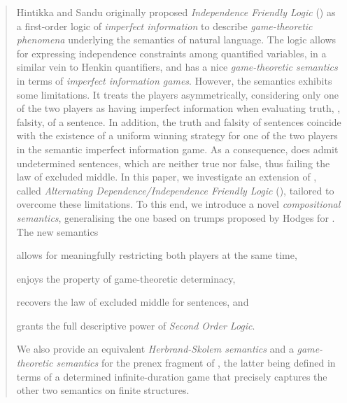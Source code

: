 \documentclass[authoryear]{elsarticle}
\begin{document}
\begin{abstract}

Hintikka and Sandu originally proposed \emph{Independence Friendly Logic} (\IF)
as a first-order logic of \emph{imperfect information} to describe
\emph{game-theoretic phenomena} underlying the semantics of natural language.
The logic allows for expressing independence constraints among quantified
variables, in a similar vein to Henkin quantifiers, and has a nice
\emph{game-theoretic semantics} in terms of \emph{imperfect information games}.
However, the \IF semantics exhibits some limitations.
It treats the players asymmetrically, considering only one of the two players as
having imperfect information when evaluating truth, \resp, falsity, of a
sentence.
%
In addition, the truth and falsity of sentences coincide with the existence of a
uniform winning strategy for one of the two players in the semantic imperfect
information game.
As a consequence, \IF does admit undetermined sentences, which are neither true
nor false, thus failing the law of excluded middle.
In this paper, we investigate an extension of \IF, called \emph{Alternating
Dependence/Independence Friendly Logic} (\ADIF), tailored to overcome these
limitations.
To this end, we introduce a novel \emph{compositional semantics}, generalising
the one based on trumps proposed by Hodges for \IF.
The new semantics
\begin{inparaenum}[(i)]
  \item
    allows for meaningfully restricting both players at the same time,
  \item
    enjoys the property of game-theoretic determinacy,
  \item
    recovers the law of excluded middle for sentences, and
  \item
    grants \ADIF the full descriptive power of \emph{Second Order Logic}.
\end{inparaenum}
We also provide an equivalent \emph{Herbrand-Skolem semantics} and a
\emph{game-theoretic semantics} for the prenex fragment of \ADIF, the latter
being defined in terms of a determined infinite-duration game that precisely
captures the other two semantics on finite structures.

\end{abstract}





  \maketitle
\end{document}

